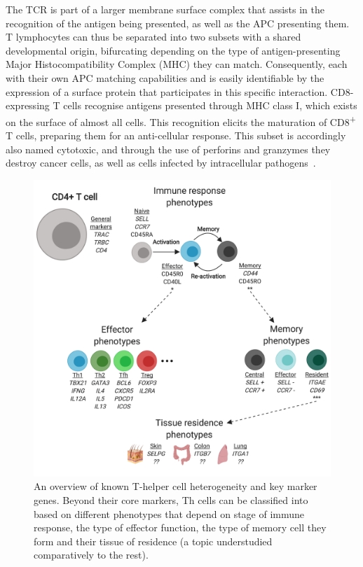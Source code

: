 The TCR is part of a larger membrane surface complex that assists in the recognition of the antigen being presented, as well as the APC presenting them. T lymphocytes can thus be separated into two subsets with a shared developmental origin, bifurcating depending on the type of antigen-presenting Major Histocompatibility Complex (MHC) they can match. Consequently, each with their own APC matching capabilities and is easily identifiable by the expression of a surface protein that participates in this specific interaction. CD8-expressing T cells recognise antigens presented through MHC class I, which exists on the surface of almost all cells. This recognition elicits the maturation of CD8\textsuperscript{+} T cells, preparing them for an anti-cellular response. This subset is accordingly also named cytotoxic, and through the use of perforins and granzymes they destroy cancer cells, as well as cells infected by intracellular pathogens~\citep{halle_mechanisms_2017}.

\begin{figure}[ht!]
    \centering    
    \includegraphics[width=1.0\textwidth]{Chapter1/Figs/chap1_fig1.png} %
    \caption[T-helper cell heterogeneity and key marker genes]{An overview of known T-helper cell heterogeneity and key marker genes. Beyond their core markers, Th cells can be classified into based on different phenotypes that depend on stage of immune response, the type of effector function, the type of memory cell they form and their tissue of residence (a topic understudied comparatively to the rest).}
    \label{fig:chap1_fig1}
\end{figure}

